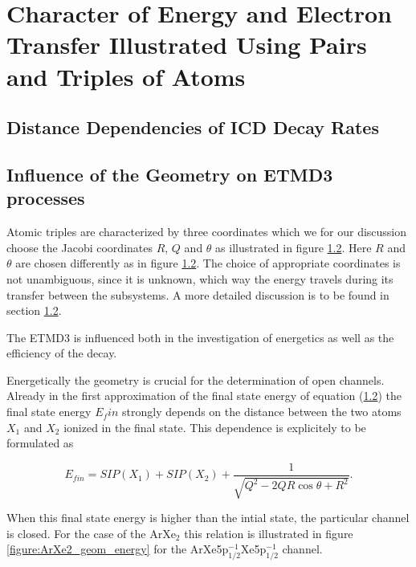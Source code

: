 \section{Character of Energy and Electron Transfer Illustrated Using Pairs and Triples of Atoms}

\subsection{Distance Dependencies of ICD Decay Rates}


\subsection{Influence of the Geometry on ETMD3 processes}
Atomic triples are characterized by three coordinates which we for
our discussion choose the Jacobi coordinates $R$, $Q$ and $\theta$ as illustrated
in figure \ref{}. Here $R$ and $\theta$ are chosen differently as in
figure \ref{}. The choice of appropriate coordinates is not unambiguous,
since it is unknown, which way the energy travels during its transfer
between the subsystems. A more detailed discussion is to be found in 
section \ref{}.

The \ac{ETMD}3 is influenced both in the investigation of energetics
as well as the efficiency of the decay.

Energetically the geometry is crucial for the determination of open channels.
Already in the first approximation of the final state energy of equation (\ref{})
the final state energy $E_fin$ strongly depends on the distance between the
two atoms $X_1$ and $X_2$ ionized in the final state. This dependence is explicitely to be
formulated as

\begin{equation}
  E_{fin} = SIP(X_1) + SIP(X_2) + \frac{1}{\sqrt{Q^2 - 2QR\cos\theta + R^2}} .
\end{equation}

When this final state energy is higher than the intial state, the particular
channel is closed. For the case of the ArXe$_2$ this relation is illustrated
in figure \ref{figure:ArXe2_geom_energy} for the
ArXe5p$_{1/2}^{-1}$Xe5p$_{1/2}^{-1}$ channel.

